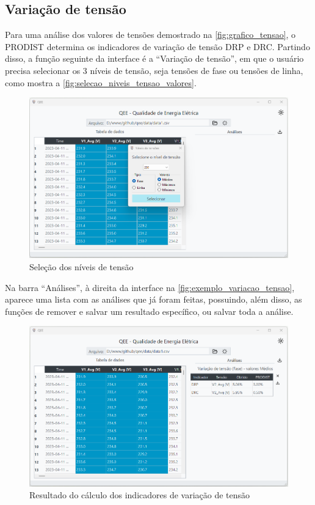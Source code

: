 \subsection{Variação de tensão}

Para uma análise dos valores de tensões demostrado na \autoref{fig:grafico_tensao}, o PRODIST determina os indicadores de variação de tensão DRP e DRC. Partindo disso, a função seguinte da interface é a “Variação de tensão”, em que o usuário precisa selecionar os 3 níveis de tensão, seja tensões de fase ou tensões de linha, como mostra a \autoref{fig:selecao_niveis_tensao_valores}.

\begin{figure}[H]
  \centering
  \caption{Seleção dos níveis de tensão}
  \label{fig:selecao_niveis_tensao_valores}
  \includegraphics[width=15cm]{illustrations/figures/selecao_niveis_tensao_valores.png}
\end{figure}

Na barra “Análises”, à direita da interface na \autoref{fig:exemplo_variacao_tensao}, aparece uma lista com as análises que já foram feitas, possuindo, além disso, as funções de remover e salvar um resultado específico, ou salvar toda a análise.

\begin{figure}[H]
  \centering
  \caption{Resultado do cálculo dos indicadores de variação de tensão}
  \label{fig:exemplo_variacao_tensao}
  \includegraphics[width=15cm]{illustrations/figures/exemplo_variacao_tensao.png}
\end{figure}


